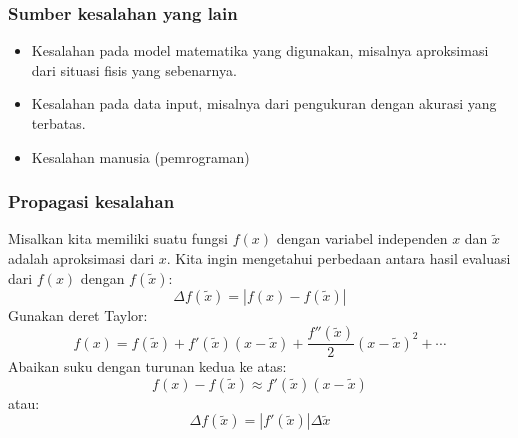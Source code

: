 \documentclass[9pt]{beamer}
\begin{document}
\begin{frame}
\frametitle{Sumber kesalahan yang lain}

\begin{itemize}
\item Kesalahan pada model matematika yang digunakan,
misalnya aproksimasi dari situasi fisis yang sebenarnya.
\item Kesalahan pada data input, misalnya dari pengukuran dengan akurasi yang terbatas.
\item Kesalahan manusia (pemrograman)
\end{itemize}


\end{frame}



\begin{frame}
\frametitle{Propagasi kesalahan}

Misalkan kita memiliki suatu fungsi $f(x)$ dengan variabel independen $x$ dan
$\tilde{x}$ adalah aproksimasi dari $x$. Kita ingin mengetahui perbedaan antara
hasil evaluasi dari $f(x)$ dengan $f(\tilde{x})$:
\begin{equation}
\Delta f(\tilde{x}) = \left| f(x) - f(\tilde{x}) \right|
\end{equation}
Gunakan deret Taylor:
\begin{equation}
f(x) = f(\tilde{x}) + f'(\tilde{x})(x - \tilde{x}) + \frac{f''(\tilde{x})}{2}(x - \tilde{x})^2 + \cdots
\end{equation}
Abaikan suku dengan turunan kedua ke atas:
\begin{equation}
f(x) - f(\tilde{x}) \approx f'(\tilde{x})(x - \tilde{x})
\end{equation}
atau:
\begin{equation}
\Delta f(\tilde{x}) = \left| f'(\tilde{x}) \right| \Delta \tilde{x}
\end{equation}

\end{frame}
\end{document}
